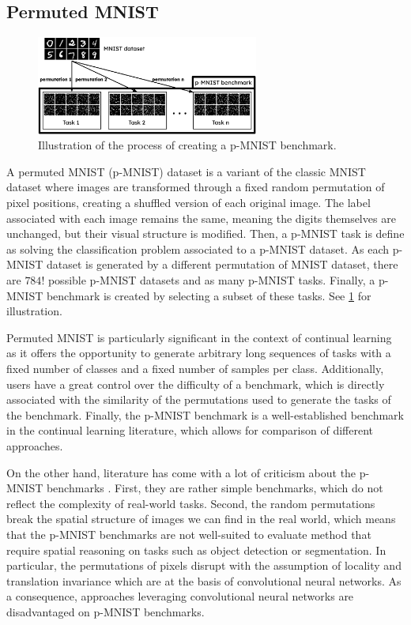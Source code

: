 \documentclass[11pt]{article}
\begin{document}
\subsection{Permuted MNIST}


\begin{figure}
    \centering
    \includegraphics[width=0.65\textwidth]{images/p-MNIST.png}
    \caption{Illustration of the process of creating a p-MNIST benchmark.}
    \label{fig:p-MNIST}
\end{figure}

A permuted MNIST (p-MNIST) dataset \cite{pMNIST} is a variant of the classic MNIST dataset where images are transformed through a fixed random permutation of pixel positions, creating a shuffled version of each original image. The label associated with each image remains the same, meaning the digits themselves are unchanged, but their visual structure is modified. Then, a p-MNIST task is define as solving the classification problem associated to a p-MNIST dataset. As each p-MNIST dataset is generated by a different permutation of MNIST dataset, there are $784!$ possible p-MNIST datasets and as many p-MNIST tasks. Finally, a p-MNIST benchmark is created by selecting a subset of these tasks. See \ref{fig:p-MNIST} for illustration.

\vspace{2mm}
\noindent
Permuted MNIST is particularly significant in the context of continual learning as it offers the opportunity to generate arbitrary long sequences of tasks with a fixed number of classes and a fixed number of samples per class. Additionally, users have a great control over the difficulty of a benchmark, which is directly associated with the similarity of the permutations used to generate the tasks of the benchmark. Finally, the p-MNIST benchmark is a well-established benchmark in the continual learning literature, which allows for comparison of different approaches.

\vspace{2mm}
\noindent
On the other hand, literature has come with a lot of criticism about the p-MNIST benchmarks \cite{frameworks_1_pMNIST_critic_1}\cite{pMNIST_critic_2}. First, they are rather simple benchmarks, which do not reflect the complexity of real-world tasks. Second, the random permutations break the spatial structure of images we can find in the real world, which means that the p-MNIST benchmarks are not well-suited to evaluate method that require spatial reasoning on tasks such as object detection or segmentation. In particular, the permutations of pixels disrupt with the assumption of locality and translation invariance which are at the basis of convolutional neural networks. As a consequence, approaches leveraging convolutional neural networks are disadvantaged on p-MNIST benchmarks.
\end{document}
